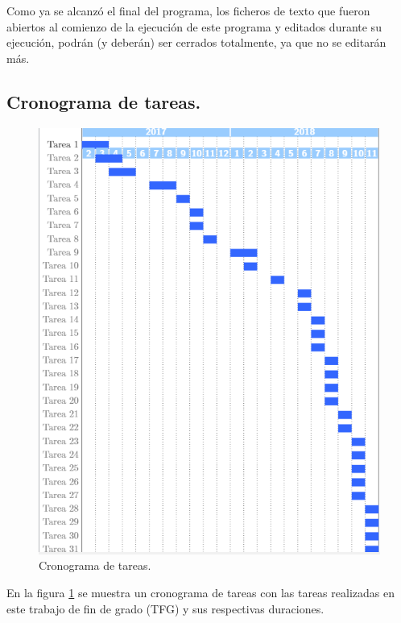 Como ya se alcanzó el final del programa, los ficheros de texto que fueron abiertos al comienzo de la ejecución de este programa y editados durante su ejecución, podrán (y deberán) ser cerrados totalmente, ya que no se editarán más.



\subsection{Cronograma de tareas.}

\begin{figure}[h!]
  	\centering
	\includegraphics[width=\textwidth]{CronogramaTareas/cronogramaTareas.PNG}
	\caption{Cronograma de tareas.
	\label{fig:CronogramaTareas/cronogramaTareas.PNG}}
\end{figure}

En la figura \ref{fig:CronogramaTareas/cronogramaTareas.PNG} se muestra un cronograma de tareas con las tareas realizadas en este trabajo de fin de grado (TFG) y sus respectivas duraciones.

